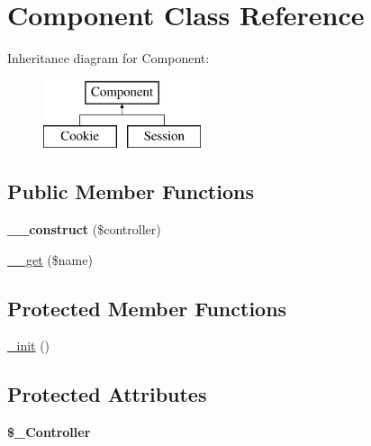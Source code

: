 \hypertarget{classComponent}{
\section{Component Class Reference}
\label{classComponent}
}
Inheritance diagram for Component:\begin{figure}[H]
\begin{center}
\leavevmode
\includegraphics[height=2.000000cm]{classComponent}
\end{center}
\end{figure}
\subsection*{Public Member Functions}
\begin{DoxyCompactItemize}
\item 
\hypertarget{classComponent_aaa6259b967067c4616a8b33a92bbb616}{
{\bfseries \_\-\_\-construct} (\$controller)}
\label{classComponent_aaa6259b967067c4616a8b33a92bbb616}

\item 
\hyperlink{classComponent_ae72a2aff44cb477971a8649abba407cd}{\_\-\_\-get} (\$name)
\end{DoxyCompactItemize}
\subsection*{Protected Member Functions}
\begin{DoxyCompactItemize}
\item 
\hyperlink{classComponent_ae69207eea0ccf6cc855e74fa05b6db17}{\_\-init} ()
\end{DoxyCompactItemize}
\subsection*{Protected Attributes}
\begin{DoxyCompactItemize}
\item 
\hypertarget{classComponent_a560d57b5dbdc6a452d39efd2a8effc49}{
{\bfseries \$\_\-Controller}}
\label{classComponent_a560d57b5dbdc6a452d39efd2a8effc49}

\end{DoxyCompactItemize}


